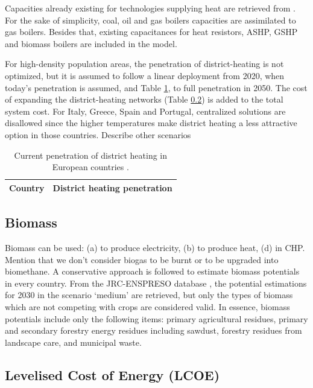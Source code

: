 \documentclass[3p]{elsarticle} %
\begin{document}
Capacities already existing for technologies supplying heat are retrieved from \cite{heating_capacities}. For the sake of simplicity, coal, oil and gas boilers capacities are assimilated to gas boilers. Besides that, existing capacitances for heat resistors, ASHP, GSHP and \textcolor[rgb]{1,0,0}{biomass} boilers are included in the model.

For high-density population areas, the penetration of district-heating is not optimized, but it is assumed to follow a linear deployment from 2020, when today's penetration is assumed, \cite{DH_penetration} and Table \ref{tab_DH_penetration}, to full penetration in 2050. The cost of expanding the district-heating networks (Table \ref{}) is added to the total system cost. For Italy, Greece, Spain and Portugal, centralized solutions are disallowed since the higher temperatures make district heating a less attractive option in those countries.   
\textcolor[rgb]{1,0,0}{Describe other scenarios }


\begin{table}
\centering
\caption{Current penetration of district heating in European countries \cite{DH_penetration}.} \label{tab_DH_penetration}
\begin{tabular}{lc}
\hline
Country & District heating penetration  \\
\hline

\hline
\end{tabular}
\end{table}

\subsection{Biomass}
\textcolor[rgb]{1,0,0}{Biomass can be used: (a) to produce electricity, (b) to produce heat, (d) in CHP. Mention that we don't consider biogas to be burnt or to be upgraded into biomethane.} 
A conservative approach is followed to estimate biomass potentials in every country. From the JRC-ENSPRESO database \cite{JRC_biomass, ENSPRESO}, the potential estimations for 2030 in the scenario `medium' are retrieved, but only the types of biomass which are not competing with crops are considered valid. In essence, biomass potentials include only the following items: primary agricultural residues, primary and secondary forestry energy residues including sawdust, forestry residues from landscape care, and municipal waste.

\subsection{Levelised Cost of Energy (LCOE)}
\end{document}
